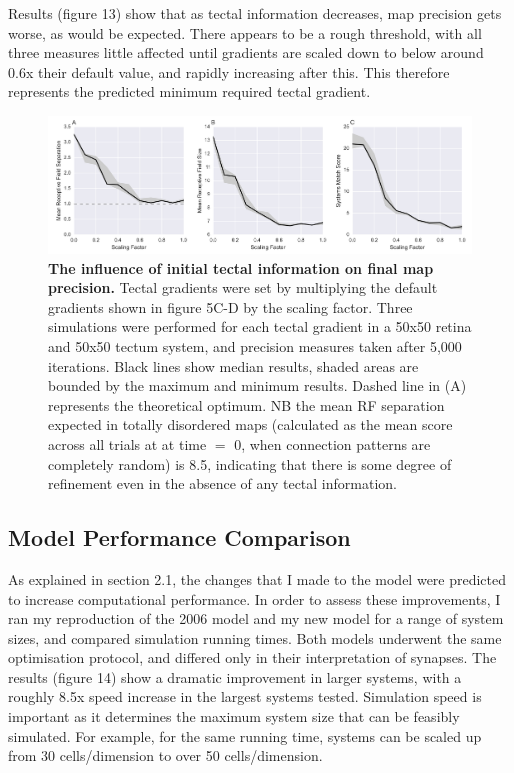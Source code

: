 \documentclass[11pt]{"article"}
\begin{document}
Results (figure 13) show that as tectal information decreases, map precision gets worse, as would be expected. There appears to be a rough threshold, with all three measures little affected until gradients are scaled down to below around 0.6x their default value, and rapidly increasing after this. This therefore represents the predicted minimum required tectal gradient. 
\\

\begin{figure}[!h]
\includegraphics[scale=0.55]{TectalInfoPlot}
\caption{\textbf{The influence of initial tectal information on final map precision.}
Tectal gradients were set by multiplying the default gradients shown in figure 5C-D by the scaling factor. Three simulations were performed for each tectal gradient in a 50x50 retina and 50x50 tectum system, and precision measures taken after 5,000 iterations. Black lines show median results, shaded areas are bounded by the maximum and minimum results. Dashed line in (A) represents the theoretical optimum. NB the mean RF separation expected in totally disordered maps (calculated as the mean score across all trials at at time $=$ 0, when connection patterns are completely random) is 8.5, indicating that there is some degree of refinement even in the absence of any tectal information.}
\end{figure}

\pagebreak

\subsection{Model Performance Comparison}
As explained in section 2.1, the changes that I made to the model were predicted to increase computational performance. In order to assess these improvements, I ran my reproduction of the 2006 model and my new model for a range of system sizes, and compared simulation running times. Both models underwent the same optimisation protocol, and differed only in their interpretation of synapses. The results (figure 14) show a dramatic improvement in larger systems, with a roughly 8.5x speed increase in the largest systems tested. Simulation speed is important as it determines the maximum system size that can be feasibly simulated. For example, for the same running time, systems can be scaled up from 30 cells/dimension to over 50 cells/dimension.
\end{document}

